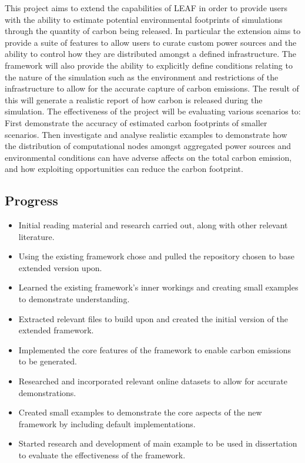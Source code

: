 \documentclass[11pt]{article}
\begin{document}
This project aims to extend the capabilities of LEAF in order to provide users with the ability to estimate potential environmental footprints
of simulations through the quantity of carbon being released.
In particular the extension aims to provide a suite of features to allow users to curate custom power sources and the ability to control
how they are distributed amongst a defined infrastructure.
The framework will also provide the ability to explicitly define conditions relating to the nature of the simulation
such as the environment and restrictions of the infrastructure to allow for the accurate capture of carbon emissions.
The result of this will generate a realistic report of how carbon is released during the simulation.
The effectiveness of the project will be evaluating various scenarios to:
First demonstrate the accuracy of estimated carbon footprints of
smaller scenarios.
Then investigate and analyse realistic examples to demonstrate how the distribution of computational nodes amongst
aggregated power sources and environmental conditions can have adverse affects on the total carbon emission, and how
exploiting opportunities can reduce the carbon footprint.

\newpage

\subsection{Progress}\label{progress}

\begin{itemize}[itemsep=0pt]
  \item Initial reading material and research carried out, along with other relevant literature.
  \item Using the existing framework chose and pulled the repository chosen to base extended version upon.
  \item Learned the existing framework's inner workings and creating small examples to demonstrate understanding.
  \item Extracted relevant files to build upon and created the initial version of the extended framework.
  \item Implemented the core features of the framework to enable carbon emissions to be generated.
  \item Researched and incorporated relevant online datasets to allow for accurate demonstrations.
  \item Created small examples to demonstrate the core aspects of the new framework by including default implementations.
  \item Started research and development of main example to be used in dissertation to evaluate the effectiveness of the framework.
\end{itemize}
\end{document}
